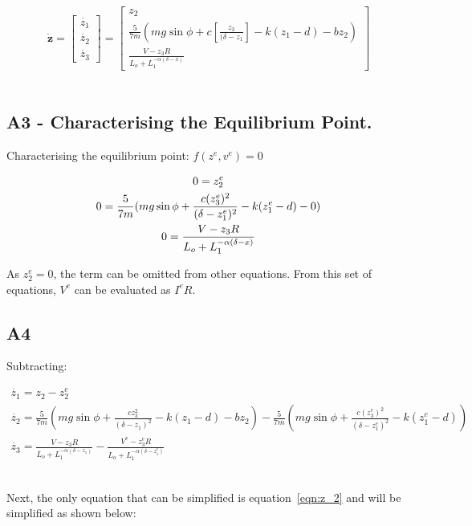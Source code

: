 \documentclass[a4paper,10pt,reqno]{amsart}
\numberwithin{equation}{section}
\begin{document}
\begin{equation}
\bm{\dot{z}}=
\begin{bmatrix}
\dot{z_1}
\\
\dot{z_2}
\\
\dot{z_3}
\end{bmatrix}
=
\begin{bmatrix}
z_2
\\
\frac{5}{7m}(mg\sin{\phi}+c[\frac{z_3}{(\delta-z_1}]-k(z_1-d)-bz_2)
\\
\frac{V-z_3R}{L_o+L_1^{-\alpha(\delta-x)}}
\end{bmatrix}
\end{equation}
\\
\subsection{A3 - Characterising the Equilibrium Point.}\label{sec:A3} 

\par Characterising the equilibrium point: $f(z^e,v^e)=0$

\begin{gather}
    0=z_2^e
    \notag\\
    0=\frac{5}{7m}(mg\sin{\phi}+\frac{c(z_3^e)^2}{(\delta-z_1^e)^2}-k(z_1^e-d)-0)
    \notag\\
    0=\frac{V-z_3R}{L_o+L_1^{-\alpha(\delta-x)}}
\end{gather}

\par As $z_2^e=0$, the term can be omitted from other equations. From this set of equations, $V^e$ can be evaluated as $I^eR$.

\subsection{A4}\label{sec:A4}

\par Subtracting:

\begin{gather}
    \dot{z_1}=z_2-z_2^e
    \\
    \dot{z_2} = \frac{5}{7m}(mg\sin{\phi}+\frac{cz_3^2}{(\delta-z_1)^2}-k(z_1-d)-bz_2)-\frac{5}{7m}(mg\sin{\phi}+\frac{c(z_3^e)^2}{(\delta-z_1^e)^2}-k(z_1^e-d))
    \label{eqn:z_2}\\
    \dot{z_3}=\frac{V-z_3R}{L_o+L_1^{-\alpha(\delta-z_1)}}-\frac{V^e-z_3^eR}{L_o+L_1^{-\alpha(\delta-z_1^e)}}
\end{gather}
\\
\par Next, the only equation that can be simplified is equation~\ref{eqn:z_2} and will be simplified as shown below:
\end{document}
